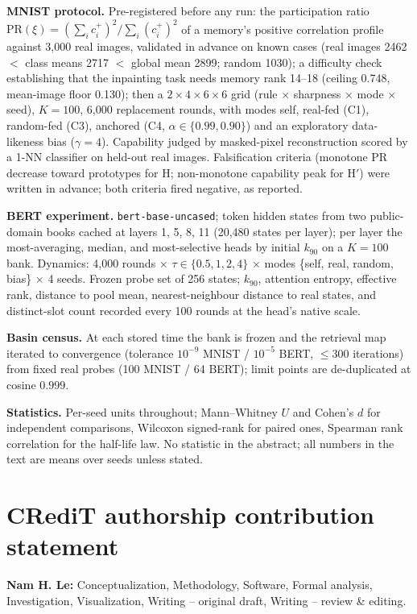 \documentclass[preprint,12pt,authoryear]{elsarticle}
\begin{document}
\textbf{MNIST protocol.} Pre-registered before any run: the participation
ratio $\mathrm{PR}(\xi)=(\sum_i c_i^{+})^2/\sum_i (c_i^{+})^{2}$ of a
memory's positive correlation profile against 3{,}000 real images, validated
in advance on known cases (real images 2462 $<$ class means 2717 $<$
global mean 2899; random 1030); a difficulty check establishing that the
inpainting task needs memory rank 14--18 (ceiling 0.748, mean-image floor
0.130); then a $2\times4\times6\times6$ grid (rule $\times$ sharpness
$\times$ mode $\times$ seed), $K=100$, 6{,}000 replacement rounds, with
modes self, real-fed (C1), random-fed (C3), anchored (C4,
$\alpha\in\{0.99,0.90\}$) and an exploratory data-likeness bias
($\gamma=4$). Capability judged by masked-pixel reconstruction scored by a
1-NN classifier on held-out real images. Falsification criteria (monotone
PR decrease toward prototypes for H; non-monotone capability peak for
H$'$) were written in advance; both criteria fired negative, as reported.

\textbf{BERT experiment.} \texttt{bert-base-uncased}; token hidden states
from two public-domain books cached at layers 1, 5, 8, 11 (20{,}480
states per layer); per layer the most-averaging, median, and
most-selective heads by initial $k_{90}$ on a $K=100$ bank. Dynamics:
4{,}000 rounds $\times$ $\tau\in\{0.5,1,2,4\}$ $\times$ modes
\{self, real, random, bias\} $\times$ 4 seeds. Frozen probe set of 256
states; $k_{90}$, attention entropy, effective rank, distance to pool
mean, nearest-neighbour distance to real states, and distinct-slot count
recorded every 100 rounds at the head's native scale.

\textbf{Basin census.} At each stored time the bank is frozen and the
retrieval map iterated to convergence (tolerance $10^{-9}$ MNIST /
$10^{-5}$ BERT, $\leq300$ iterations) from fixed real probes (100 MNIST /
64 BERT); limit points are de-duplicated at cosine $0.999$.

\textbf{Statistics.} Per-seed units throughout; Mann--Whitney $U$ and
Cohen's $d$ for independent comparisons, Wilcoxon signed-rank for paired
ones, Spearman rank correlation for the half-life law. No statistic in the
abstract; all numbers in the text are means over seeds unless stated.

\section*{CRediT authorship contribution statement}
\textbf{Nam H. Le:} Conceptualization, Methodology, Software, Formal
analysis, Investigation, Visualization, Writing -- original draft, Writing
-- review \& editing.
\end{document}
